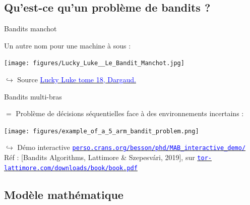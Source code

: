 \documentclass[11pt,french,ignorenonframetext,]{beamer}
\begin{document}
\subsection{\hfill{}Qu'est-ce qu'un problème de bandits ?\hfill{}}


\begin{frame}{Bandits manchot}

  Un autre nom pour une machine à sous :

  \begin{center}
    \texttt{[image: figures/Lucky\_Luke\_\_Le\_Bandit\_Manchot.jpg]}
  \end{center}

  \begin{tiny}
  $\hookrightarrow$ Source
    \href{https://www.dargaud.com/bd/LUCKY-LUKE/Lucky-Luke/Lucky-Luke-tome-18-Bandit-manchot-Le}{\textcolor{blue}{Lucky Luke tome 18, \textcopyright{} Dargaud.}}
  \end{tiny}

\end{frame}


\begin{frame}{Bandits multi-bras}

  $=$ Problème de décisions séquentielles face à des environnements incertains :

  \begin{center}
    \texttt{[image: figures/example\_of\_a\_5\_arm\_bandit\_problem.png]}
  \end{center}

  \begin{tiny}
  $\hookrightarrow$ Démo interactive
    \href{https://perso.crans.org/besson/phd/MAB_interactive_demo/}{\textcolor{blue}{\texttt{perso.crans.org/besson/phd/MAB\_interactive\_demo/}}}\\
    Réf : [Bandits Algorithms, Lattimore \& Szepesv{\'a}ri, 2019],
    sur \href{https://tor-lattimore.com/downloads/book/book.pdf}{\textcolor{blue}{\texttt{tor-lattimore.com/downloads/book/book.pdf}}}
  \end{tiny}

\end{frame}


\subsection{\hfill{}Modèle mathématique\hfill{}}
\end{document}
